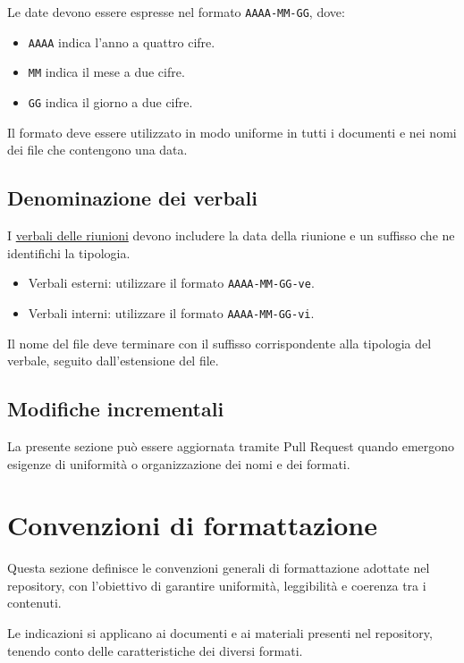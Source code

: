 \documentclass[11pt, a4paper]{article}
\begin{document}
Le date devono essere espresse nel formato \texttt{AAAA-MM-GG}, dove:
\begin{itemize}
    \item \texttt{AAAA} indica l'anno a quattro cifre.
    \item \texttt{MM} indica il mese a due cifre.
    \item \texttt{GG} indica il giorno a due cifre.
\end{itemize}

\noindent Il formato deve essere utilizzato in modo uniforme in tutti i documenti e nei nomi dei file che contengono una data.

\subsection{Denominazione dei verbali}

I \href{https://github.com/On-By-One-Team/On-By-One.github.io/tree/main/docs/pdf/verbali}{verbali delle riunioni} devono includere la data della riunione e un suffisso che ne identifichi la tipologia.
\begin{itemize}
    \item Verbali esterni: utilizzare il formato \texttt{AAAA-MM-GG-ve}.
    \item Verbali interni: utilizzare il formato \texttt{AAAA-MM-GG-vi}.
\end{itemize}

\noindent Il nome del file deve terminare con il suffisso corrispondente alla tipologia del verbale, seguito dall'estensione del file.

\subsection{Modifiche incrementali}

La presente sezione può essere aggiornata tramite Pull Request quando emergono esigenze di uniformità o organizzazione dei nomi e dei formati.

\section{Convenzioni di formattazione}

Questa sezione definisce le convenzioni generali di formattazione adottate nel repository, con l'obiettivo di garantire uniformità, leggibilità e coerenza tra i contenuti.

Le indicazioni si applicano ai documenti e ai materiali presenti nel repository, tenendo conto delle caratteristiche dei diversi formati.
\end{document}
